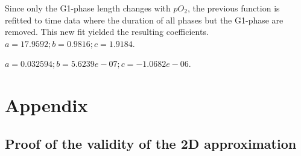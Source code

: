 \documentclass[11pt,a4paper]{article}
\begin{document}
Since only the G1-phase length changes with $pO_2$, the previous function is refitted to time data where the duration of all phases but the G1-phase are removed. This new fit yielded the resulting coefficients. $a =  17.9592;  b = 0.9816; c = 1.9184$.
  
$a =  0.032594;  b = 5.6239e-07; c = -1.0682e-06$.


\section*{Appendix}
\subsection*{Proof of the validity of the 2D approximation}
\newpage


\end{document}
